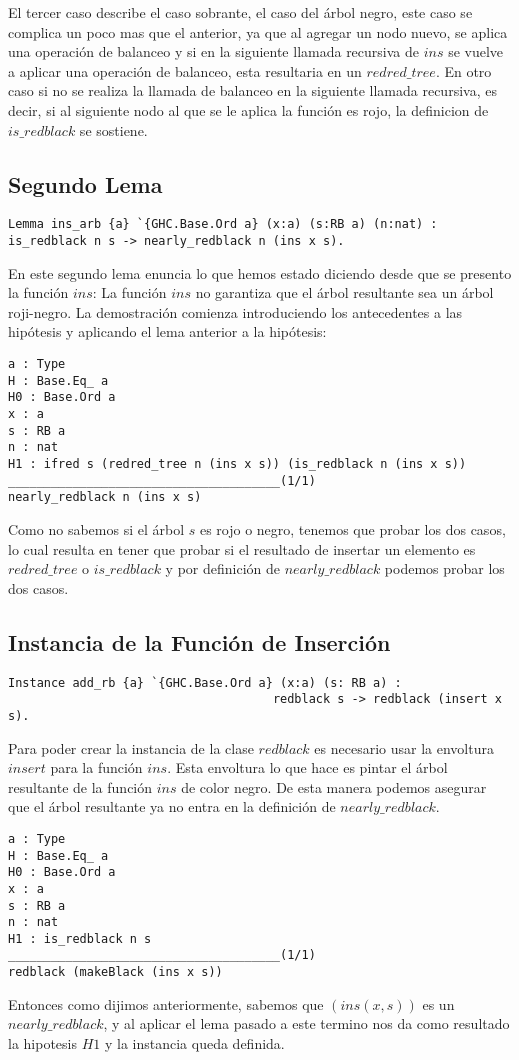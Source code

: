 \documentclass[letterpaper,12pt,oneside]{book}
\newcommand{\arn}{árbol roji-negro}
\theoremstyle{plain}
\theoremstyle{definition}
\theoremstyle{remark}
\begin{document}
 El tercer caso describe el caso sobrante, el caso del \'arbol negro, este caso se complica un poco mas que el anterior, ya que al 
 agregar un nodo nuevo, se aplica una operaci\'on de balanceo y si en la siguiente llamada recursiva de $ins$ se vuelve a aplicar una operaci\'on 
 de balanceo, esta resultaria en un $redred\_tree$. En otro caso si no se realiza la llamada de balanceo en la siguiente llamada recursiva, es decir, si al siguiente nodo al que se le aplica la funci\'on es rojo, la definicion de $is\_redblack$ se sostiene.
\subsection{Segundo Lema}
\begin{verbatim}
Lemma ins_arb {a} `{GHC.Base.Ord a} (x:a) (s:RB a) (n:nat) : 
is_redblack n s -> nearly_redblack n (ins x s).
\end{verbatim}
En este segundo lema enuncia lo que hemos estado diciendo desde que se presento la funci\'on $ins$: La funci\'on $ins$ no garantiza que el \'arbol 
resultante sea un {{{\arn}}}. La demostraci\'on comienza introduciendo los antecedentes a las hipótesis y aplicando el lema anterior a la hip\'otesis:
\begin{verbatim}
a : Type
H : Base.Eq_ a
H0 : Base.Ord a
x : a
s : RB a
n : nat
H1 : ifred s (redred_tree n (ins x s)) (is_redblack n (ins x s))
______________________________________(1/1)
nearly_redblack n (ins x s)
\end{verbatim}
Como no sabemos si el \'arbol $s$ es rojo o negro, tenemos que probar los dos casos, lo cual resulta en tener que probar si el resultado de insertar un elemento
es $redred\_tree$ o $is\_redblack$ y por definici\'on  de $nearly\_redblack$ podemos probar los dos casos.
\subsection{Instancia de la Funci\'on de Inserci\'on}
\begin{verbatim}
Instance add_rb {a} `{GHC.Base.Ord a} (x:a) (s: RB a) :
                                     redblack s -> redblack (insert x s).
\end{verbatim}
Para poder crear la instancia de la clase $redblack$ es necesario usar la envoltura $insert$ para la funci\'on $ins$. Esta envoltura lo que hace es pintar el \'arbol resultante de la funci\'on $ins$ de color negro. De esta manera podemos asegurar que el \'arbol resultante ya no entra en la definici\'on de $nearly\_redblack$.
\begin{verbatim}
a : Type
H : Base.Eq_ a
H0 : Base.Ord a
x : a
s : RB a
n : nat
H1 : is_redblack n s
______________________________________(1/1)
redblack (makeBlack (ins x s))
\end{verbatim}
Entonces como dijimos anteriormente, sabemos que $(ins(x,s))$ es un $nearly\_redblack$, y al aplicar el lema pasado a este termino nos da como resultado la hipotesis $H1$ y la instancia queda definida.
\end{document}
